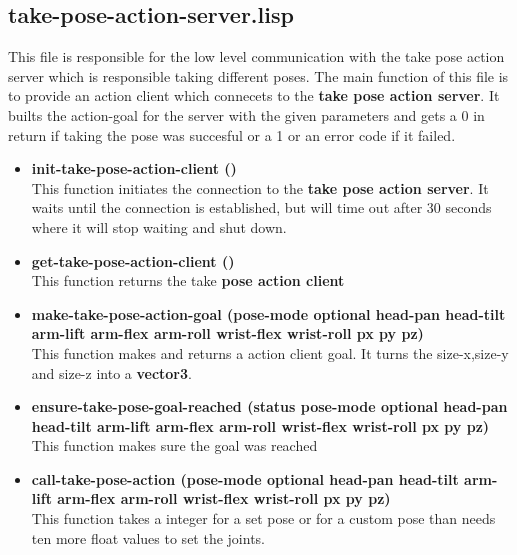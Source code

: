 \documentclass[main.tex]{subfiles}
\begin{document}
		\subsection{take-pose-action-server.lisp}
		This file is responsible for the low level communication with the
		take pose action server which is responsible taking different poses. The main function of this file is to provide an action client which connecets to the \textbf{take pose action server}. It builts the action-goal for the server with the given parameters and gets a 0 in return if taking the pose was succesful or a 1  or an error code if it failed.
		\begin{itemize}
			\item \textbf{init-take-pose-action-client ()} \\
			This function initiates the connection to the \textbf{take pose action server}. It waits until the connection is established, but will time out after 30 seconds where it will stop waiting and shut down. 
			\item \textbf{get-take-pose-action-client ()} \\
			This function returns the take \textbf{pose action client}
			\item \textbf{make-take-pose-action-goal (pose-mode optional head-pan head-tilt arm-lift arm-flex arm-roll wrist-flex wrist-roll px py pz)} \\
			This function makes and returns a action client goal. It turns the size-x,size-y and size-z into a \textbf{vector3}.
			\item \textbf{ensure-take-pose-goal-reached (status pose-mode optional head-pan head-tilt arm-lift arm-flex arm-roll wrist-flex wrist-roll px py pz)} \\
            This function makes sure the goal was reached
			\item \textbf{call-take-pose-action (pose-mode optional head-pan head-tilt arm-lift arm-flex arm-roll wrist-flex wrist-roll px py pz)} \\
			This function takes a integer for a set pose or for a custom pose than needs ten more float values to set the joints.
		\end{itemize}
\end{document}
